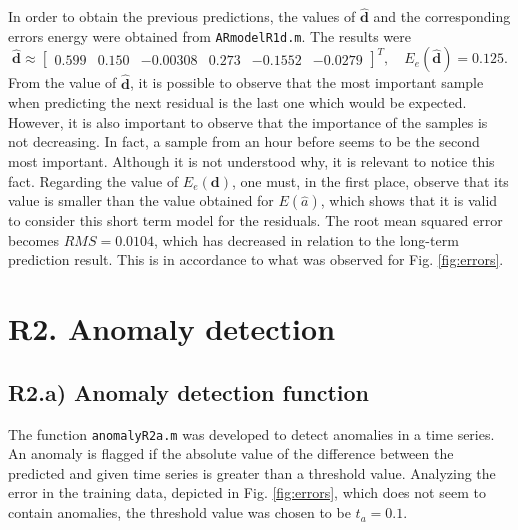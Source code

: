 \documentclass[a4paper, oneside, 11pt]{article}
\begin{document}
In order to obtain the previous predictions, the values of $\hat{\mathbf{d}}$ and the corresponding errors energy were obtained from \texttt{ARmodelR1d.m}. The results were
\begin{equation*}
    \hat{\mathbf{d}} \approx \begin{bmatrix} 0.599 & 0.150 & -0.00308 & 0.273 & -0.1552 & -0.0279 \end{bmatrix}^T, \quad E_e(\hat{\mathbf{d}}) = 0.125.
\end{equation*}
From the value of $\hat{\mathbf{d}}$, it is possible to observe that the most important sample when predicting the next residual is the last one which would be expected. However, it is also important to observe that the importance of the samples is not decreasing. In fact, a sample from an hour before seems to be the second most important. Although it is not understood why, it is relevant to notice this fact. Regarding the value of $E_e(\mathbf{d})$, one must, in the first place, observe that its value is smaller than the value obtained for $E(\hat{a})$, which shows that it is valid to consider this short term model for the residuals. The root mean squared error becomes $RMS = 0.0104$, which has decreased in relation to the long-term prediction result. This is in accordance to what was observed for Fig. \ref{fig:errors}.

\section{R2. Anomaly detection}\label{sec:R2}
\subsection{R2.a) Anomaly detection function}\label{sec:r2a}
The function \texttt{anomalyR2a.m} was developed to detect anomalies in a time series. An anomaly is flagged if the absolute value of the difference between the predicted and given time series is greater than a threshold value. Analyzing the error in the training data, depicted in Fig. \ref{fig:errors}, which does not seem to contain anomalies, the threshold value was chosen to be $t_a = 0.1$.
\end{document}
